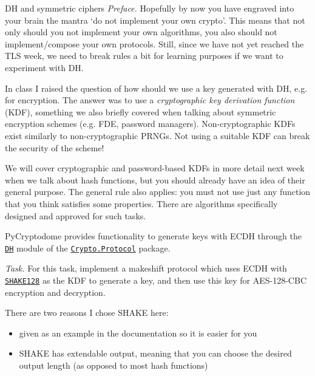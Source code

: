 \documentclass{practice}
\begin{document}
\begin{task}{DH and symmetric ciphers}
  \textit{Preface.}
  Hopefully by now you have engraved into your brain the mantra `do not implement your own crypto'.
  This means that not only should you not implement your own algorithms, you also should not implement/compose your own protocols.
  Still, since we have not yet reached the TLS week, we need to break rules a bit for learning purposes if we want to experiment with DH.

  In class I raised the question of how should we use a key generated with DH, e.g. for encryption.
  The answer was to use a \emph{cryptographic key derivation function} (KDF), something we also briefly covered when talking about symmetric encryption schemes (e.g. FDE, password managers).
  Non-cryptographic KDFs exist similarly to non-cryptographic PRNGs.
  Not using a suitable KDF can break the security of the scheme!

  We will cover cryptographic and password-based KDFs in more detail next week when we talk about hash functions, but you should already have an idea of their general purpose.
  The general rule also applies: you must not use just any function that you think satisfies some properties.
  There are algorithms specifically designed and approved for such tasks.

  PyCryptodome provides functionality to generate keys with ECDH through the \href{https://pycryptodome.readthedocs.io/en/latest/src/protocol/dh.html}{\texttt{DH}} module of the \href{https://pycryptodome.readthedocs.io/en/latest/src/protocol/protocol.html}{\texttt{Crypto.Protocol}} package.

  \textit{Task.}
  For this task, implement a makeshift protocol which uses ECDH with \href{https://pycryptodome.readthedocs.io/en/latest/src/hash/shake128.html#shake128}{\texttt{SHAKE128}} as the KDF to generate a key, and then use this key for AES-128-CBC encryption and decryption.

  There are two reasons I chose SHAKE here:
  \begin{itemize}
    \item given as an example in the documentation so it is easier for you
    \item SHAKE has extendable output, meaning that you can choose the desired output length (as opposed to most hash functions)
  \end{itemize}
\end{task}
\end{document}
